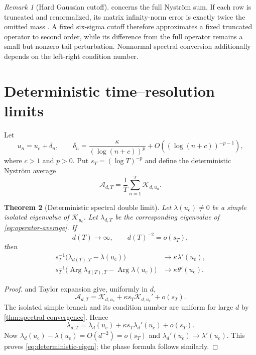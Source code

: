 \documentclass[11pt]{article}
\newtheorem{theorem}{Theorem}[section]
\theoremstyle{definition}
\theoremstyle{remark}
\newtheorem{remark}[theorem]{Remark}
\newcommand{\uc}{u_{\mathrm c}}
\newcommand{\cK}{\mathcal K}
\newcommand{\cA}{\mathcal A}
\newcommand{\Arg}{\operatorname{Arg}}
\begin{document}
\begin{remark}[Hard Gaussian cutoff]\label{rem:cutoff}
 concerns the full Nystr\"om sum.  If each row
is truncated and renormalized, its matrix infinity-norm error is exactly
twice the omitted mass \citep{WangGaussianResponse2026}.  A fixed six-sigma
cutoff therefore approximates a fixed truncated operator to second order,
while its difference from the full operator remains a small but nonzero tail
perturbation.  Nonnormal spectral conversion additionally depends on the
left-right condition number.
\end{remark}

\section{Deterministic time--resolution limits}
\label{sec:deterministic}

Let
\begin{equation}\label{eq:schedule}
  u_n=\uc+\delta_n,\qquad
  \delta_n=\frac{\kappa}{(\log(n+c))^p}
  +O((\log(n+c))^{-p-1}),
\end{equation}
where $c>1$ and $p>0$.  Put $s_T=(\log T)^{-p}$ and define the deterministic
Nystr\"om average
\begin{equation}\label{eq:operator-average}
  \cA_{d,T}=\frac1T\sum_{n=1}^T\cK_{d,u_n}.
\end{equation}

\begin{theorem}[Deterministic spectral double limit]
\label{thm:deterministic-double}
Let $\lambda(\uc)\ne0$ be a simple isolated eigenvalue of $\cK_{\uc}$.
Let $\lambda_{d,T}$ be the corresponding eigenvalue of \eqref{eq:operator-average}.
If
\begin{equation}\label{eq:deterministic-condition}
  d(T)\longrightarrow\infty,\qquad
  d(T)^{-2}=o(s_T),
\end{equation}
then
\begin{align}
  s_T^{-1}\bigl(\lambda_{d(T),T}-\lambda(\uc)\bigr)
  &\longrightarrow\kappa\lambda'(\uc),\label{eq:deterministic-eigen}\\
  s_T^{-1}\bigl(\Arg\lambda_{d(T),T}-\Arg\lambda(\uc)\bigr)
  &\longrightarrow\kappa\theta'(\uc).
  \label{eq:deterministic-phase}
\end{align}
\end{theorem}

\begin{proof}
 and Taylor expansion give, uniformly in $d$,
\[
  \cA_{d,T}
  =\cK_{d,\uc}+\kappa s_T\cK_{d,\uc}'+o(s_T).
\]
The isolated simple branch and its condition number are uniform for large
$d$ by \cref{thm:spectral-convergence}.  Hence
\[
  \lambda_{d,T}
  =\lambda_d(\uc)+\kappa s_T\lambda_d'(\uc)+o(s_T).
\]
Now $\lambda_d(\uc)-\lambda(\uc)=O(d^{-2})=o(s_T)$ and
$\lambda_d'(\uc)\to\lambda'(\uc)$.  This proves
\eqref{eq:deterministic-eigen}; the phase formula follows similarly.
\end{proof}
\end{document}
